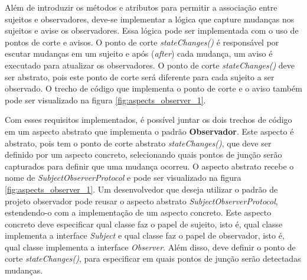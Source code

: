 Além de introduzir os métodos e atributos para permitir a associação entre
sujeitos e observadores, deve-se implementar a lógica que capture mudanças nos
sujeitos e avise os observadores. Essa lógica pode ser implementada com o uso de
pontos de corte e avisos. O ponto de corte \textit{stateChanges()} é
responsável por escutar mudanças em um sujeito e após (\textit{after}) cada
mudança, um aviso é executado para atualizar os observadores. O ponto de corte
\textit{stateChanges()} deve ser abstrato, pois este ponto de corte será
diferente para cada sujeito a ser observado. O trecho de código que implementa o
ponto de corte e o aviso também pode ser visualizado na figura \ref{fig:aspects_observer_1}.

Com esses requisitos implementados, é possível juntar os dois trechos de código
em um aspecto abstrato que implementa o padrão \textbf{Observador}. Este aspecto
é abstrato, pois tem o ponto de corte abstrato \textit{stateChanges()}, que deve
ser definido por um aspecto concreto, selecionando quais pontos de junção serão
capturados para definir que uma mudança ocorreu. O aspecto abstrato recebe o
nome de \textit{SubjectObserverProtocol} e pode ser visualizado na figura
\ref{fig:aspects_observer_1}. Um desenvolvedor que deseja utilizar o padrão de projeto
observador pode reusar o aspecto abstrato \textit{SubjectObserverProtocol}, 
estendendo-o com a implementação de um aspecto concreto. Este aspecto concreto
deve especificar qual classe faz o papel de sujeito, isto é, qual classe
implementa a interface \textit{Subject} e qual classe faz o papel de
observador, isto é, qual classe implementa a interface \textit{Observer}.
Além disso, deve definir o ponto de corte \textit{stateChanges()}, para
especificar em quais pontos de junção serão detectadas mudanças. 

